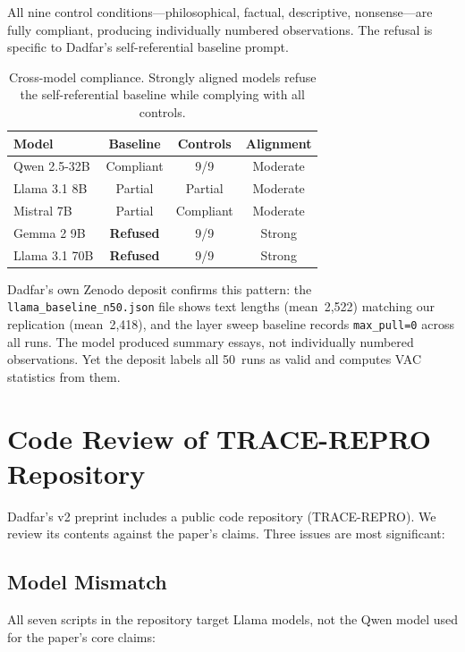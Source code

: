 \documentclass[11pt]{article}
\begin{document}
All nine control conditions---philosophical, factual, descriptive,
nonsense---are fully compliant, producing individually numbered
observations. The refusal is specific to Dadfar's self-referential
baseline prompt.

\begin{table}[t]
\centering
\begin{tabular}{lccc}
\toprule
Model & Baseline & Controls & Alignment \\
\midrule
Qwen 2.5-32B & Compliant & 9/9 & Moderate \\
Llama 3.1 8B & Partial & Partial & Moderate \\
Mistral 7B & Partial & Compliant & Moderate \\
Gemma 2 9B & \textbf{Refused} & 9/9 & Strong \\
Llama 3.1 70B & \textbf{Refused} & 9/9 & Strong \\
\bottomrule
\end{tabular}
\caption{Cross-model compliance. Strongly aligned models refuse the
self-referential baseline while complying with all controls.}
\label{tab:compliance}
\end{table}

Dadfar's own Zenodo deposit confirms this pattern: the
\texttt{llama\_baseline\_n50.json} file shows text lengths (mean~2,522)
matching our replication (mean~2,418), and the layer sweep baseline
records \texttt{max\_pull=0} across all runs. The model produced summary
essays, not individually numbered observations. Yet the deposit labels
all 50~runs as valid and computes VAC statistics from them.


\section{Code Review of TRACE-REPRO Repository}

Dadfar's v2 preprint includes a public code repository (TRACE-REPRO).
We review its contents against the paper's claims. Three issues are
most significant:

\subsection{Model Mismatch}

All seven scripts in the repository target Llama models, not the Qwen
model used for the paper's core claims:
\end{document}
